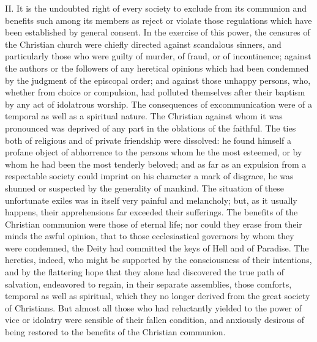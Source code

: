 





II. It is the undoubted right of every society to exclude from
its communion and benefits such among its members as reject or
violate those regulations which have been established by general
consent. In the exercise of this power, the censures of the
Christian church were chiefly directed against scandalous
sinners, and particularly those who were guilty of murder, of
fraud, or of incontinence; against the authors or the followers
of any heretical opinions which had been condemned by the
judgment of the episcopal order; and against those unhappy
persons, who, whether from choice or compulsion, had polluted
themselves after their baptism by any act of idolatrous worship.
The consequences of excommunication were of a temporal as well as
a spiritual nature. The Christian against whom it was pronounced
was deprived of any part in the oblations of the faithful. The
ties both of religious and of private friendship were dissolved:
he found himself a profane object of abhorrence to the persons
whom he the most esteemed, or by whom he had been the most
tenderly beloved; and as far as an expulsion from a respectable
society could imprint on his character a mark of disgrace, he was
shunned or suspected by the generality of mankind. The situation
of these unfortunate exiles was in itself very painful and
melancholy; but, as it usually happens, their apprehensions far
exceeded their sufferings. The benefits of the Christian
communion were those of eternal life; nor could they erase from
their minds the awful opinion, that to those ecclesiastical
governors by whom they were condemned, the Deity had committed
the keys of Hell and of Paradise. The heretics, indeed, who might
be supported by the consciousness of their intentions, and by the
flattering hope that they alone had discovered the true path of
salvation, endeavored to regain, in their separate assemblies,
those comforts, temporal as well as spiritual, which they no
longer derived from the great society of Christians. But almost
all those who had reluctantly yielded to the power of vice or
idolatry were sensible of their fallen condition, and anxiously
desirous of being restored to the benefits of the Christian
communion.

